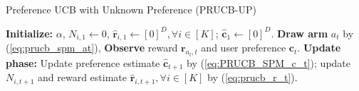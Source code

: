 \begin{algorithm}[t]
\caption{Preference UCB with Unknown Preference (PRUCB-UP)}
\label{alg:PRUCB_UP}
\begin{algorithmic}
\State \textbf{Initialize:} $\alpha$,
$N_{i, 1} \!\leftarrow\! 0$, $\boldsymbol{\hat{r}}_{i,1} \!\leftarrow\! [0]^{D}, \forall i \!\in\! [K]$;
$\boldsymbol{\hat{c}}_{1} \!\leftarrow\! [0]^D$.
    \State \textbf{Draw arm} $a_t$ by (\ref{eq:prucb_spm_at}), 
    \State \textbf{Observe} reward $\boldsymbol{r}_{a_t, t}$ and user preference $\boldsymbol{c}_{t}$.
    \State \textbf{Update phase:} 
    \State \indent Update preference estimate $\hat{\boldsymbol{c}}_{t+1}$ by (\ref{eq:PRUCB_SPM_c_t}); update $N_{i, t+1}$ and reward estimate $\hat{\boldsymbol{r}}_{i,t+1}, \forall i \in [K]$ by (\ref{eq:prucb_r_t}).
\EndFor
\end{algorithmic}
\end{algorithm}